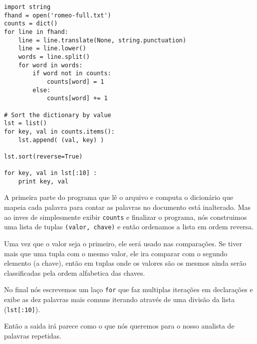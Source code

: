 \beforeverb
\begin{verbatim}
import string
fhand = open('romeo-full.txt')
counts = dict()
for line in fhand:
    line = line.translate(None, string.punctuation)
    line = line.lower()
    words = line.split()
    for word in words:
        if word not in counts:
            counts[word] = 1
        else:
            counts[word] += 1

# Sort the dictionary by value
lst = list()
for key, val in counts.items():
    lst.append( (val, key) )

lst.sort(reverse=True)

for key, val in lst[:10] :
    print key, val
\end{verbatim}
\afterverb
%
A primeira parte do programa que lê o arquivo e computa o dicionário
que mapeia cada palavra para contar as palavras no documento está
inalterado. Mas ao inves de simplesmente exibir {\tt counts} e 
finalizar o programa, nós construimos uma lista de tuplas 
{\tt (valor, chave)} e então ordenamos a lista em ordem reversa.

Uma vez que o valor seja o primeiro, ele será usado nas comparações.
Se tiver mais que uma tupla com o mesmo valor, ele ira comparar
com o segundo elemento (a chave), então em tuplas onde os valores são
os mesmos ainda serão classificadas pela ordem alfabetica das chaves.

No final nós escrevemos um laço {\tt for} que faz multiplas
iterações em declarações e exibe as dez palavras mais comuns iterando
através de uma divisão da lista ({\tt lst[:10]}).

Então a saida irá parece como o que nós queremos para o nosso
analista de palavras repetidas.

